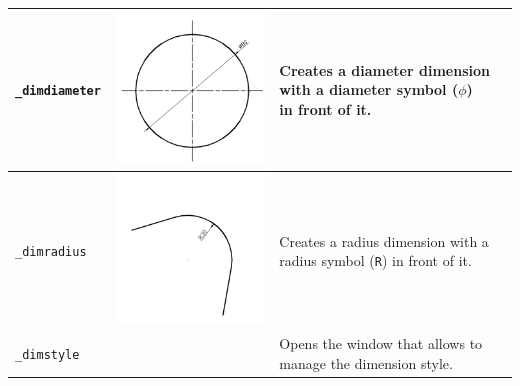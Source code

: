 \documentclass[..]{../IEEEphot}
\begin{document}
\begin{center}
\begin{longtable}{m{.2\linewidth}m{.2\linewidth}m{.25\linewidth}m{.25\linewidth}}
\\
\midrule
\texttt{\_dimdiameter} & \includegraphics[width = 0.8\linewidth, keepaspectratio]{../images/jpg/_dimdiameter.jpg} & Creates a diameter dimension with a diameter symbol ($\phi$) in front of it. & 
\\
\midrule
\texttt{\_dimradius} & \includegraphics[width = 0.8\linewidth, keepaspectratio]{../images/jpg/_dimradius.jpg} & Creates a radius dimension with a radius symbol (\texttt{R}) in front of it. & 
\\
\midrule
\texttt{\_dimstyle} & & Opens the window that allows to manage the dimension style. & 
\\
\bottomrule
\end{longtable}
\end{center}
\end{document}
